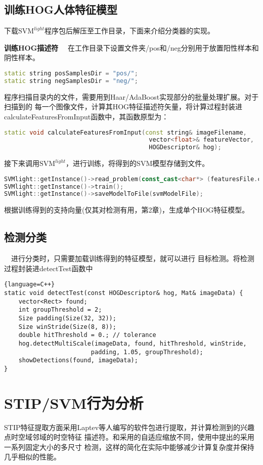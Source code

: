 \subsection{训练HOG人体特征模型}
下载$\textrm{SVM}^{light}$程序包后解压至工作目录，下面来介绍分类器的实现。

\textbf{训练HOG描述符}~~
在工作目录下设置文件夹\textsf{/pos}和\textsf{/neg}分别用于放置阳性样本和阴性样本。
\begin{lstlisting}[language=C++]
static string posSamplesDir = "pos/";
static string negSamplesDir = "neg/";
\end{lstlisting}
程序扫描目录内的文件，需要用到Haar/AdaBoost实现部分的批量处理扩展。对于扫描到的
每一个图像文件，计算其HOG特征描述符矢量，将计算过程封装进
\textsf{calculateFeaturesFromInput}函数中，其函数原型为：
\begin{lstlisting}[language=C++]
static void calculateFeaturesFromInput(const string& imageFilename,
                                        vector<float>& featureVector,
                                        HOGDescriptor& hog);
\end{lstlisting}
接下来调用$\textrm{SVM}^{light}$，进行训练，将得到的SVM模型存储到文件。
\begin{lstlisting}[language=C++]
SVMlight::getInstance()->read_problem(const_cast<char*> (featuresFile.c_str()));
SVMlight::getInstance()->train();
SVMlight::getInstance()->saveModelToFile(svmModelFile);
\end{lstlisting}
根据训练得到的支持向量(仅其对检测有用，第2章)，生成单个HOG特征模型。
\subsection{检测分类}~~进行分类时，只需要加载训练得到的特征模型，就可以进行
目标检测。将检测过程封装进\textsf{detectTest}函数中
\begin{lstlisting}{language=C++}
static void detectTest(const HOGDescriptor& hog, Mat& imageData) {
    vector<Rect> found;
    int groupThreshold = 2;
    Size padding(Size(32, 32));
    Size winStride(Size(8, 8));
    double hitThreshold = 0.; // tolerance
    hog.detectMultiScale(imageData, found, hitThreshold, winStride, 
                        padding, 1.05, groupThreshold);
    showDetections(found, imageData);
}
\end{lstlisting}

\section{STIP/SVM行为分析}
STIP特征提取方面采用Laptev等人编写的软件包进行提取，并计算检测到的兴趣点时空域邻域的时空特征
描述符。和\cite{ostip}采用的自适应缩放不同，使用\cite{stip}中提出的采用一系列固定大小的多尺寸
检测，这样的简化在实际中能够减少计算复杂度并保持几乎相似的性能。

